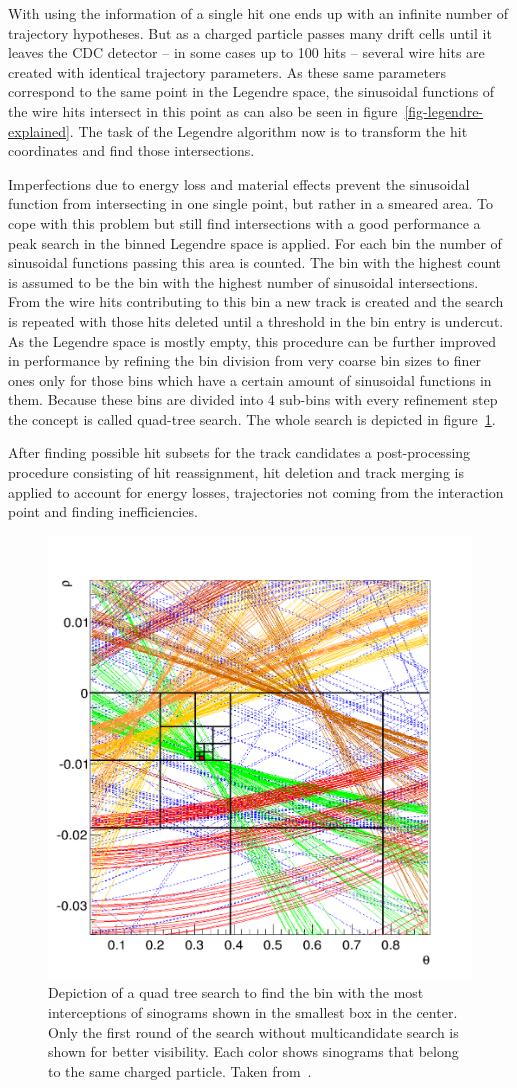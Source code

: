 With using the information of a single hit one ends up with an infinite number of trajectory hypotheses. But as a charged particle passes many drift cells until it leaves the CDC detector -- in some cases up to 100 hits -- several wire hits are created with identical trajectory parameters. As these same parameters correspond to the same point in the Legendre space, the sinusoidal functions of the wire hits intersect in this point as can also be seen in figure~\ref{fig-legendre-explained}. The task of the Legendre algorithm now is to transform the hit coordinates and find those intersections.

Imperfections due to energy loss and material effects prevent the sinusoidal function from intersecting in one single point, but rather in a smeared area. To cope with this problem but still find intersections with a good performance a peak search in the binned Legendre space is applied. For each bin the number of sinusoidal functions passing this area is counted. The bin with the highest count is assumed to be the bin with the highest number of sinusoidal intersections. From the wire hits contributing to this bin a new track is created and the search is repeated with those hits deleted until a threshold in the bin entry is undercut. As the Legendre space is mostly empty, this procedure can be further improved in performance by refining the bin division from very coarse bin sizes to finer ones only for those bins which have a certain amount of sinusoidal functions in them. Because these bins are divided into 4 sub-bins with every refinement step the concept is called quad-tree search. The whole search is depicted in figure~\ref{fig-quad-tree-search}.

After finding possible hit subsets for the track candidates a post-processing procedure consisting of hit reassignment, hit deletion and track merging is applied to account for energy losses, trajectories not coming from the interaction point and finding inefficiencies.

\begin{figure}
  \centering
  \includegraphics[width=0.5\linewidth]{figures/theory/quad_tree.png}
  \caption[Quad tree search.]{Depiction of a quad tree search to find the bin with the most interceptions of sinograms shown in the smallest box in the center. Only the first round of the search without multicandidate search is shown for better visibility. Each color shows sinograms that belong to the same charged particle. Taken from~\cite{viktor_dpg}.}
  \label{fig-quad-tree-search}
\end{figure}


